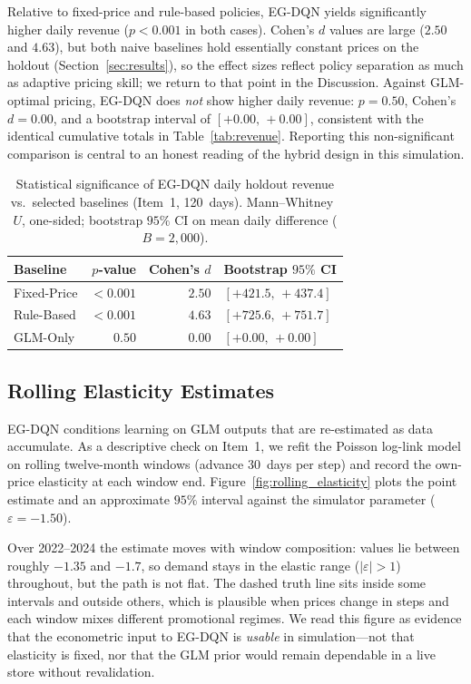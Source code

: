 \documentclass[journal, 10pt, twoside]{IEEEtran}
\begin{document}
Relative to fixed-price and rule-based policies, EG-DQN yields
significantly higher daily revenue ($p<0.001$ in both cases).
Cohen's $d$ values are large ($2.50$ and $4.63$), but both naive
baselines hold essentially constant prices on the holdout
(Section~\ref{sec:results}), so the effect sizes reflect policy separation
as much as adaptive pricing skill; we return to that point in the
Discussion.
Against GLM-optimal pricing, EG-DQN does \emph{not} show higher daily
revenue: $p=0.50$, Cohen's $d=0.00$, and a bootstrap interval of
$[+0.00,\,+0.00]$, consistent with the identical cumulative totals in
Table~\ref{tab:revenue}.
Reporting this non-significant comparison is central to an honest reading
of the hybrid design in this simulation.

\begin{table}[H]
\centering
\caption{Statistical significance of EG-DQN daily holdout revenue vs.\
selected baselines (Item~1, 120~days).
Mann--Whitney~$U$, one-sided; bootstrap $95\%$ CI on mean daily
difference ($B=2{,}000$).}
\label{tab:significance}
\begin{tabular}{lrrl}
\toprule
\textbf{Baseline} & \textbf{$p$-value} & \textbf{Cohen's $d$} &
  \textbf{Bootstrap $95\%$ CI} \\
\midrule
Fixed-Price & $<0.001$ & $2.50$ & $[+421.5,\,+437.4]$ \\
Rule-Based  & $<0.001$ & $4.63$ & $[+725.6,\,+751.7]$ \\
GLM-Only    & $0.50$   & $0.00$ & $[+0.00,\,+0.00]$ \\
\bottomrule
\end{tabular}
\end{table}

\subsection{Rolling Elasticity Estimates}

EG-DQN conditions learning on GLM outputs that are re-estimated as data
accumulate.
As a descriptive check on Item~1, we refit the Poisson log-link model on
rolling twelve-month windows (advance $30$~days per step) and record the
own-price elasticity at each window end.
Figure~\ref{fig:rolling_elasticity} plots the point estimate and an
approximate $95\%$ interval against the simulator parameter
($\varepsilon=-1.50$).

Over 2022--2024 the estimate moves with window composition: values lie
between roughly $-1.35$ and $-1.7$, so demand stays in the elastic range
($|\varepsilon|>1$) throughout, but the path is not flat.
The dashed truth line sits inside some intervals and outside others,
which is plausible when prices change in steps and each window mixes
different promotional regimes.
We read this figure as evidence that the econometric input to EG-DQN is
\emph{usable} in simulation---not that elasticity is fixed, nor that the
GLM prior would remain dependable in a live store without revalidation.
\end{document}

